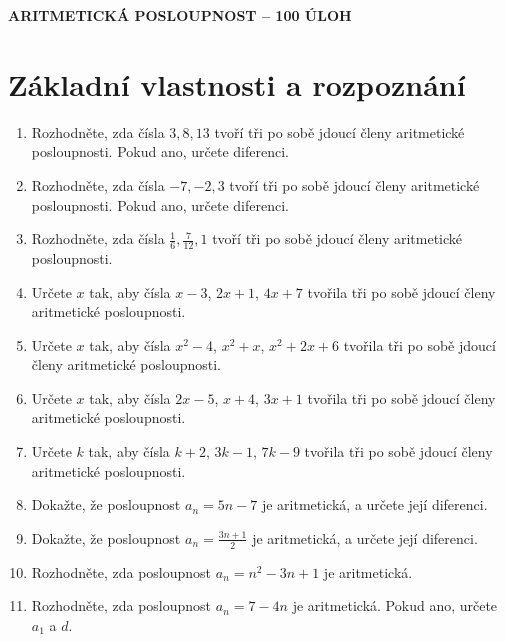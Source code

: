 \documentclass[11pt,a4paper]{article}
\begin{document}
\begin{center}
    {\Large\bfseries ARITMETICKÁ POSLOUPNOST -- 100 ÚLOH}
\end{center}

\vspace{0.8em}

\section*{Základní vlastnosti a rozpoznání}

\begin{enumerate}
    \item Rozhodněte, zda čísla $3, 8, 13$ tvoří tři po sobě jdoucí členy aritmetické posloupnosti. Pokud ano, určete diferenci.

    \item Rozhodněte, zda čísla $-7, -2, 3$ tvoří tři po sobě jdoucí členy aritmetické posloupnosti. Pokud ano, určete diferenci.

    \item Rozhodněte, zda čísla $\frac16, \frac{7}{12}, 1$ tvoří tři po sobě jdoucí členy aritmetické posloupnosti.

    \item Určete $x$ tak, aby čísla $x-3$, $2x+1$, $4x+7$ tvořila tři po sobě jdoucí členy aritmetické posloupnosti.

    \item Určete $x$ tak, aby čísla $x^2-4$, $x^2+x$, $x^2+2x+6$ tvořila tři po sobě jdoucí členy aritmetické posloupnosti.

    \item Určete $x$ tak, aby čísla $2x-5$, $x+4$, $3x+1$ tvořila tři po sobě jdoucí členy aritmetické posloupnosti.

    \item Určete $k$ tak, aby čísla $k+2$, $3k-1$, $7k-9$ tvořila tři po sobě jdoucí členy aritmetické posloupnosti.

    \item Dokažte, že posloupnost $a_n=5n-7$ je aritmetická, a určete její diferenci.

    \item Dokažte, že posloupnost $a_n=\frac{3n+1}{2}$ je aritmetická, a určete její diferenci.

    \item Rozhodněte, zda posloupnost $a_n=n^2-3n+1$ je aritmetická.

    \item Rozhodněte, zda posloupnost $a_n=7-4n$ je aritmetická. Pokud ano, určete $a_1$ a $d$.


\end{enumerate}
\end{document}
